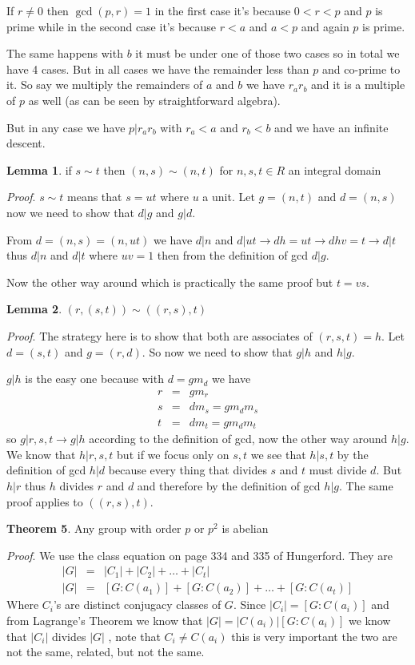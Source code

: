 \documentclass[aps,preprint,preprintnumbers,nofootinbib,showpacs,prd]{revtex4-1}
\newcommand{\nbea}{\begin{eqnarray*}}
\newcommand{\neea}{\end{eqnarray*}}
\begin{document}
If $r \neq 0$ then $\gcd(p,r) = 1$ in the first case it's because $0 < r < p$ and $p$ is prime while in the second case it's because $r < a$ and $a < p$ and again $p$ is prime. 

The same happens with $b$ it must be under one of those two cases so in total we have 4 cases. But in all cases we have the remainder less than $p$ and co-prime to it. So say we multiply the remainders of $a$ and $b$ we have $r_ar_b$ and it is a multiple of $p$ as well (as can be seen by straightforward algebra).

But in any case we have $p|r_ar_b$ with $r_a < a$ and $r_b < b$ and we have an infinite descent.



{\bf Lemma 1}. if $s \sim t$ then $(n,s) \sim (n,t)$ for $n,s,t \in R$ an integral domain 

{\it Proof}. $s \sim t$ means that $s = ut$ where $u$ a unit. Let $g = (n,t)$ and $d = (n,s)$ now we need to show that $d|g$ and $g|d$.

From $d = (n,s) = (n,ut)$ we have $d|n$ and $d|ut\to dh = ut \to dhv = t \to d|t$ thus $d|n$ and $d|t$ where $uv = 1$ then from the definition of gcd $d|g$.

Now the other way around which is practically the same proof but $t = vs$.



{\bf Lemma 2}. $(r,(s,t)) \sim ((r,s), t)$

{\it Proof}. The strategy here is to show that both are associates of $(r,s,t) = h$. Let $d = (s,t)$ and $g = (r,d)$. So now we need to show that $g|h$ and $h|g$.

$g|h$ is the easy one because with $d = g m_d$ we have
%
\nbea
r & = & g m_r \\
s & = & d m_s = g m_d m_s \\
t & = & d m_t = g m_d m_t
\neea
%
so $g | r,s,t \to g|h$ according to the definition of gcd, now the other way around $h|g$. We know that $h|r,s,t$ but if we focus only on $s,t$ we see that $h|s,t$ by the definition of gcd $h|d$ because every thing that divides $s$ and $t$ must divide $d$. But $h|r$ thus $h$ divides $r$ and $d$ and therefore by the definition of gcd $h|g$. The same proof applies to $((r,s),t)$.

{\bf Theorem 5}. Any group with order $p$ or $p^2$ is abelian

{\it Proof}. We use the class equation on page 334 and 335 of Hungerford. They are
%
\nbea
|G| & = & |C_1| + |C_2| + \dots + |C_t| \\
|G| & = & [G:C(a_1)] + [G:C(a_2)] + \dots + [G:C(a_t)]
\neea
%
Where $C_i$'s are distinct conjugacy classes of $G$. Since $|C_i| = [G:C(a_i)]$ and from Lagrange's Theorem we know that $|G| = |C(a_i)|[G:C(a_i)]$ we know that $|C_i|$ divides $|G|$ , note that $C_i \neq C(a_i)$ this is very important the two are not the same, related, but not the same.
\end{document}
